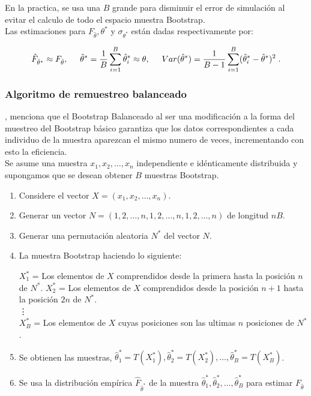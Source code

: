 En la practica, se usa una $B$ grande para disminuir el error de simulación al evitar el calculo de todo el espacio muestra Bootstrap.\\

Las estimaciones para  $F_{\hat{\theta}}, \theta^{*}$ y $ \sigma_{\theta^{*}} $ están dadas respectivamente por:

\[
\hat{F}_{\hat{\theta}^{*}} \approx F_{\hat{\theta}}, 
\hspace{.5cm} \hat{\theta}^{*} = \frac{1}{B} \sum_{i=1}^{B}  \hat{\theta}^{*}_{i} \approx \theta,
\hspace{.5cm} Var(\hat{\theta}^{*}) = \frac{1}{B-1} \sum_{i=1}^{B}(\hat{\theta}^{*}_{i}-\hat{\theta}^{*})^2 \; .
\]




\subsubsection{Algoritmo de remuestreo balanceado \parencite{balam-2012}}
\textcite{balam-2012}, menciona que el Bootstrap Balanceado al ser una modificación a la forma del muestreo del Bootstrap básico garantiza que los datos correspondientes a cada individuo de la muestra aparezcan el mismo numero de veces, incrementando con esto la eficiencia.\\

Se asume una muestra  $ x_{1}, x_{2},  \dots,  x_{n}$ independiente e idénticamente distribuida y supongamos que se desean obtener $B$ muestras Bootstrap.

\begin{enumerate}
	\item  Considere el vector $ X=(x_{1}, x_{2},  \dots,  x_{n}) $.
	
	\item  Generar un vector $ N= (1,2,\dots,n,1,2,\dots,n,1,2,\dots,n)$ de longitud $nB$.
	
	\item Generar una permutación aleatoria $N^{*}$ del vector $N$.
	
	\item La muestra Bootstrap haciendo lo siguiente:
	
	$X^{*}_{1}$ =  Los elementos de $X$ comprendidos desde la primera hasta la posición $n$ de $N^{*}$.\linebreak
	$X^{*}_{2}$ =  Los elementos de $X$ comprendidos desde la posición $n + 1$ hasta la posición $2n$ de $N^{*}$.\\
	\vdots\\
	$X^{*}_{B}$ =  Los elementos de $X$  cuyas posiciones son las ultimas $n$ posiciones de $N^{*}$.
	
	\item  Se obtienen las muestras, $\hat{\theta}^{*}_{1} =T (X^{*}_{1}), \hat{\theta}^{*}_{2} =T (X^{*}_{2}), \dots, \hat{\theta}^{*}_{B} =T (X^{*}_{B})$.
	
	\item  Se usa la distribución empírica $\hat{F}_{\hat{\theta}^{*}}$ de la muestra $\hat{\theta}^{*}_{1},\hat{\theta}^{*}_{2}, \dots, \hat{\theta}^{*}_{B}$ para estimar $F_{\hat{\theta}}$
	
\end{enumerate}



